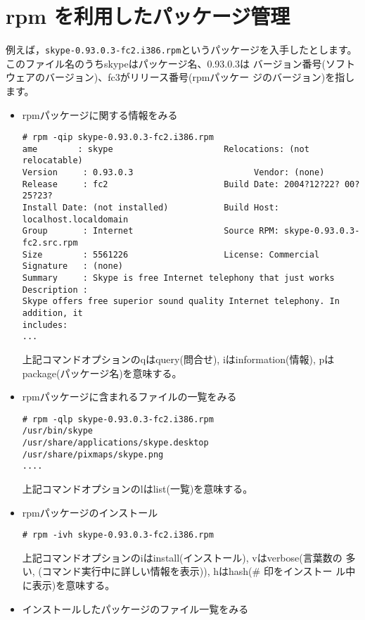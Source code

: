 \documentclass{jreport}
\begin{document}
\section{rpm を利用したパッケージ管理}
例えば，\verb|skype-0.93.0.3-fc2.i386.rpm|というパッケージを入手したとします。
このファイル名のうちskypeはパッケージ名、0.93.0.3は
バージョン番号(ソフトウェアのバージョン)、fc3がリリース番号(rpmパッケー
ジのバージョン)を指します。
\begin{itemize}
\item {rpmパッケージに関する情報をみる}
\begin{screen}
\begin{verbatim}
# rpm -qip skype-0.93.0.3-fc2.i386.rpm
ame        : skype                      Relocations: (not relocatable)
Version     : 0.93.0.3                        Vendor: (none)
Release     : fc2                       Build Date: 2004?12?22? 00?25?23?
Install Date: (not installed)           Build Host: localhost.localdomain
Group       : Internet                  Source RPM: skype-0.93.0.3-fc2.src.rpm
Size        : 5561226                   License: Commercial
Signature   : (none)
Summary     : Skype is free Internet telephony that just works
Description :
Skype offers free superior sound quality Internet telephony. In addition, it
includes:
...
\end{verbatim}
\end{screen}
上記コマンドオプションのqはquery(問合せ), iはinformation(情報), pは
package(パッケージ名)を意味する。
\item rpmパッケージに含まれるファイルの一覧をみる
\begin{screen}
\begin{verbatim}
# rpm -qlp skype-0.93.0.3-fc2.i386.rpm
/usr/bin/skype
/usr/share/applications/skype.desktop
/usr/share/pixmaps/skype.png
....
\end{verbatim}
\end{screen}
上記コマンドオプションのlはlist(一覧)を意味する。
\item {rpmパッケージのインストール}
\begin{screen}
\begin{verbatim}
# rpm -ivh skype-0.93.0.3-fc2.i386.rpm
\end{verbatim}
上記コマンドオプションのiはinstall(インストール), vはverbose(言葉数の
多い, (コマンド実行中に詳しい情報を表示)), hはhash(\# 印をインストー
ル中に表示)を意味する。
\end{screen}
\item {インストールしたパッケージのファイル一覧をみる}

\end{itemize}
\end{document}
